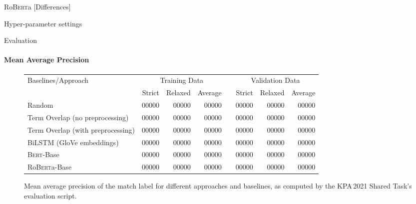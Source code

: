 \documentclass[english,handout]{mlutalk}
\newcommand{\Bert}{\textsc{Bert}\xspace}
\newcommand{\BertBase}{\Bert-Base\xspace}
\newcommand{\Roberta}{\mbox{Ro\textsc{Bert}a}\xspace}
\newcommand{\RobertaBase}{\Roberta-Base\xspace}
\newcommand{\todo}[1]{{\smaller\color{red}[#1]}}
\begin{document}
\begin{frame}{\Roberta}
  \todo{Differences}

  \begin{block}{Hyper-parameter settings}
    
  \end{block}
\end{frame}

\begin{frame}{Evaluation}
  \framesubtitle{Mean Average Precision}
  \begin{figure}
    \centering
    \caption{Mean average precision of the match label for different approaches and baselines, as computed by the KPA\,2021 Shared Task's evaluation script.}
    \tiny
    \begin{tabular}{lrrrlrrr}
      \toprule
      Baselines/Approach & \multicolumn{3}{c}{Training Data} & & \multicolumn{3}{c}{Validation Data}\\ \cmidrule{2-4} \cmidrule{6-8}
        & Strict & Relaxed & Average & & Strict & Relaxed & Average\\
      \midrule
      Random 
      & 00000 & 00000 & 00000 & & 00000 & 00000 & 00000 \\
      Term Overlap (no preprocessing)
      & 00000 & 00000 & 00000 & & 00000 & 00000 & 00000 \\
      Term Overlap (with preprocessing)
      & 00000 & 00000 & 00000 & & 00000 & 00000 & 00000 \\
      \midrule
      BiLSTM (GloVe embeddings)
      & 00000 & 00000 & 00000 & & 00000 & 00000 & 00000 \\
      \BertBase
      & 00000 & 00000 & 00000 & & 00000 & 00000 & 00000 \\
      \RobertaBase
      & 00000 & 00000 & 00000 & & 00000 & 00000 & 00000 \\
      \bottomrule
    \end{tabular}
  \end{figure}
\end{frame}
\end{document}
